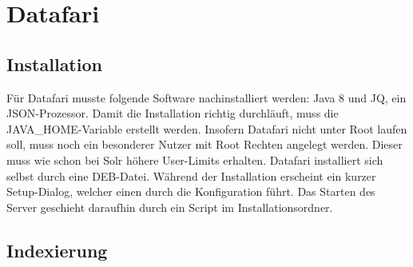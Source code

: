 
\section{Datafari}

\subsection{Installation}

Für Datafari musste folgende Software nachinstalliert werden: Java 8 und JQ, ein JSON-Prozessor. Damit die Installation richtig durchläuft, muss die JAVA\_HOME-Variable erstellt werden. Insofern Datafari nicht unter Root laufen soll, muss noch ein besonderer Nutzer mit Root Rechten angelegt werden. Dieser muss wie schon bei Solr höhere User-Limits erhalten. Datafari installiert sich selbst durch eine DEB-Datei. Während der Installation erscheint ein kurzer Setup-Dialog, welcher einen durch die Konfiguration führt. Das Starten des Server geschieht daraufhin durch ein Script im Installationsordner.

\subsection{Indexierung}

